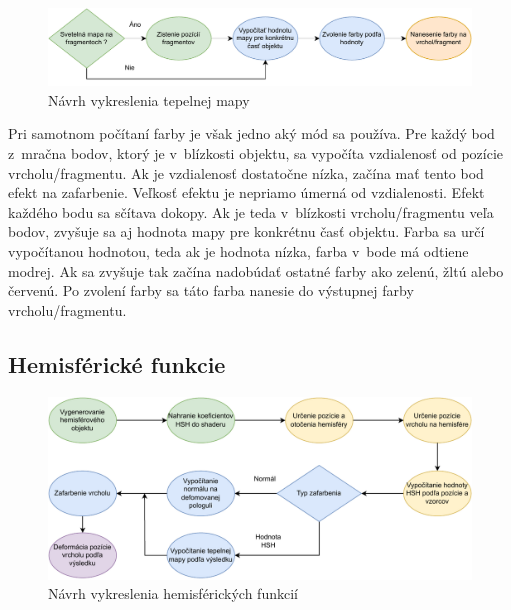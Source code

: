 \begin{figure}[b!] \label{diaHM}
    \centering
    \includegraphics[width=0.80\linewidth]{obrazky-figures/heatmap.pdf}
    \caption{Návrh vykreslenia tepelnej mapy}
\end{figure}

Pri samotnom počítaní farby je však jedno aký mód sa používa. Pre každý bod z~mračna bodov, ktorý je v~blízkosti objektu, sa vypočíta vzdialenosť od pozície vrcholu/fragmentu. Ak je vzdialenosť dostatočne nízka, začína mať tento bod efekt na zafarbenie. Veľkosť efektu je nepriamo úmerná od vzdialenosti. Efekt každého bodu sa sčítava dokopy. Ak je teda v~blízkosti vrcholu/fragmentu veľa bodov, zvyšuje sa aj hodnota mapy pre konkrétnu časť objektu. Farba sa určí vypočítanou hodnotou, teda ak je hodnota nízka, farba v~bode má odtiene modrej. Ak sa zvyšuje tak začína nadobúdať ostatné farby ako zelenú, žltú alebo červenú. Po zvolení farby sa táto farba nanesie do výstupnej farby vrcholu/fragmentu.

\subsection*{Hemisférické funkcie}
\label{HSHNavrh}

\begin{figure}[b!] \label{diaHSH}
    \centering
    \includegraphics[width=0.70\linewidth]{obrazky-figures/HSHdia.pdf}
    \caption{Návrh vykreslenia hemisférických funkcií}
\end{figure}

